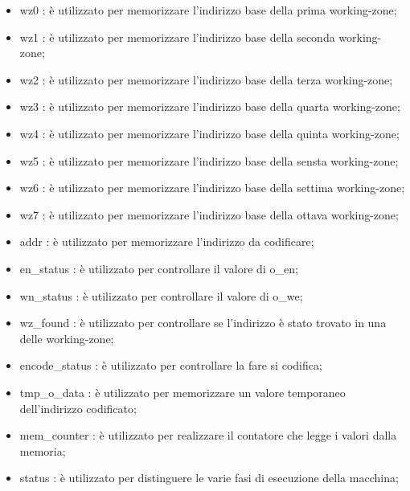\documentclass{article}
\begin{document}
\begin{itemize}
\item {\selectfont wz0} : è utilizzato per memorizzare l'indirizzo base della prima working-zone;
\item {\selectfont wz1} : è utilizzato per memorizzare l'indirizzo base della seconda working-zone;
\item {\selectfont wz2} : è utilizzato per memorizzare l'indirizzo base della terza working-zone;
\item {\selectfont wz3} : è utilizzato per memorizzare l'indirizzo base della quarta working-zone;
\item {\selectfont wz4} : è utilizzato per memorizzare l'indirizzo base della quinta working-zone;
\item {\selectfont wz5} : è utilizzato per memorizzare l'indirizzo base della sensta working-zone;
\item {\selectfont wz6} : è utilizzato per memorizzare l'indirizzo base della settima working-zone;
\item {\selectfont wz7} : è utilizzato per memorizzare l'indirizzo base della ottava working-zone;
\item {\selectfont addr} : è utilizzato per memorizzare l'indirizzo da codificare;
\item {\selectfont en\_status} : è utilizzato per controllare il valore di {\selectfont o\_en};
\item {\selectfont wn\_status} : è utilizzato per controllare il valore di {\selectfont o\_we};
\item {\selectfont wz\_found} : è utilizzato per controllare se l'indirizzo è stato trovato in una delle working-zone;
\item {\selectfont encode\_status} : è utilizzato per controllare la fare si codifica;
\item {\selectfont tmp\_o\_data} : è utilizzato per memorizzare un valore temporaneo dell'indirizzo codificato;
\item {\selectfont mem\_counter} : è utilizzato per realizzare il contatore che legge i valori dalla memoria;
\item {\selectfont status} : è utilizzato per distinguere le varie fasi di esecuzione della macchina;
\end{itemize}
\pagebreak
\end{document}
